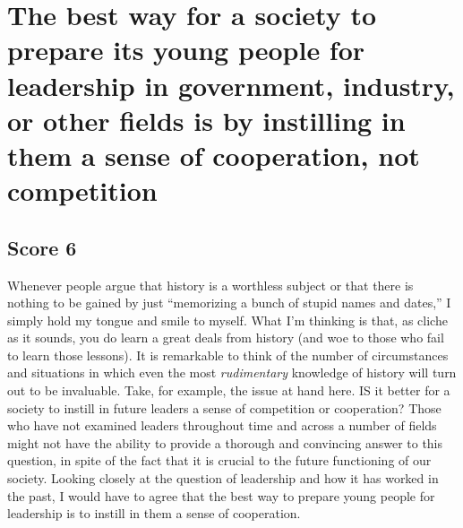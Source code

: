 \chapter{The best way for a society to prepare its young people for leadership in government, industry, or other fields is by instilling in them a sense of cooperation, not competition}

\section{Score 6}
Whenever people argue that history is a worthless subject or that there is nothing to be gained by just ``memorizing a bunch of stupid names and dates,'' I simply hold my tongue and smile to myself.
What I'm thinking is that, as cliche as it sounds, you do learn a great deals from history (and woe to those who fail to learn those lessons).
It is remarkable to think of the number of circumstances and situations in which even the most \emph{rudimentary} knowledge of history will turn out to be invaluable.
Take, for example, the issue at hand here.
IS it better for a society to instill in future leaders a sense of competition or cooperation?
Those who have not examined leaders throughout time and across a number of fields might not have the ability to provide a thorough and convincing answer to this question, in spite of the fact that it is crucial to the future functioning of our society.
Looking closely at the question of leadership and how it has worked in the past, I would have to agree that the best way to prepare young people for leadership is to instill in them a sense of cooperation.

